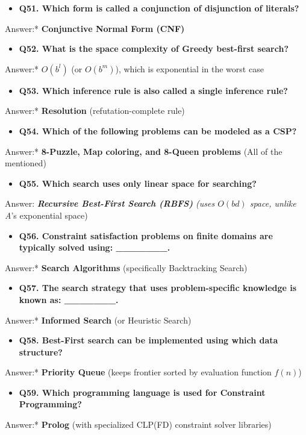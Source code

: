 \begin{itemize}
  \item   \textbf{Q51. Which form is called a conjunction of disjunction of literals?}
\end{itemize}
    \textit{   }Answer:* \textbf{Conjunctive Normal Form (CNF)}
\begin{itemize}
  \item   \textbf{Q52. What is the space complexity of Greedy best-first search?}
\end{itemize}
    \textit{   }Answer:* \textbf{$O(b^l)$} (or $O(b^m)$), which is exponential in the worst case
\begin{itemize}
  \item   \textbf{Q53. Which inference rule is also called a single inference rule?}
\end{itemize}
    \textit{   }Answer:* \textbf{Resolution} (refutation-complete rule)
\begin{itemize}
  \item   \textbf{Q54. Which of the following problems can be modeled as a CSP?}
\end{itemize}
    \textit{   }Answer:* \textbf{8-Puzzle, Map coloring, and 8-Queen problems} (All of the mentioned)
\begin{itemize}
  \item   \textbf{Q55. Which search uses only linear space for searching?}
\end{itemize}
    \textit{   }Answer:\textit{ \textbf{Recursive Best-First Search (RBFS)} (uses $O(bd)$ space, unlike A}'s exponential space)
\begin{itemize}
  \item   \textbf{Q56. Constraint satisfaction problems on finite domains are typically solved using: \_\_\_\_\_\_\_.}
\end{itemize}
    \textit{   }Answer:* \textbf{Search Algorithms} (specifically Backtracking Search)
\begin{itemize}
  \item   \textbf{Q57. The search strategy that uses problem-specific knowledge is known as: \_\_\_\_\_\_\_.}
\end{itemize}
    \textit{   }Answer:* \textbf{Informed Search} (or Heuristic Search)
\begin{itemize}
  \item   \textbf{Q58. Best-First search can be implemented using which data structure?}
\end{itemize}
    \textit{   }Answer:* \textbf{Priority Queue} (keeps frontier sorted by evaluation function $f(n)$)
\begin{itemize}
  \item   \textbf{Q59. Which programming language is used for Constraint Programming?}
\end{itemize}
    \textit{   }Answer:* \textbf{Prolog} (with specialized CLP(FD) constraint solver libraries)